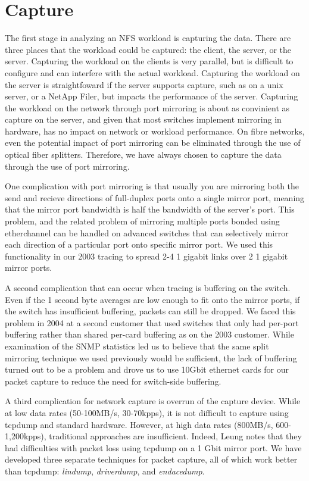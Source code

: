 \section{Capture}
\label{sec:capture}

The first stage in analyzing an NFS workload is capturing the data.
There are three places that the workload could be captured: the
client, the server, or the server.  Capturing the workload on the
clients is very parallel, but is difficult to configure and can
interfere with the actual workload.  Capturing the workload on the
server is straightfoward if the server supports capture, such as on a
unix server, or a NetApp Filer, but impacts the performance of the
server.  Capturing the workload on the network through port mirroring
is about as convinient as capture on the server, and given that most
switches implement mirroring in hardware, has no impact on network or
workload performance.  On fibre networks, even the potential impact of
port mirroring can be eliminated through the use of optical fiber
splitters. Therefore, we have always chosen to capture the
data through the use of port mirroring.

One complication with port mirroring is that usually you are mirroring
both the send and recieve directions of full-duplex ports onto a
single mirror port, meaning that the mirror port bandwidth is half the
bandwidth of the server's port.  This problem, and the related problem
of mirroring multiple ports bonded using etherchannel can be handled
on advanced switches that can selectively mirror each direction of a
particular port onto specific mirror port.  We used this functionality
in our 2003 tracing to spread 2-4 1 gigabit links over 2 1 gigabit
mirror ports.

A second complication that can occur when tracing is buffering on the
switch.  Even if the 1 second byte averages are low enough to fit onto
the mirror ports, if the switch has insufficient buffering, packets
can still be dropped.  We faced this problem in 2004 at a second
customer that used switches that only had per-port buffering rather
than shared per-card buffering as on the 2003 customer.  While
examination of the SNMP statistics led us to believe that the same
split mirroring technique we used previously would be sufficient, the
lack of buffering turned out to be a problem and drove us to use
10Gbit ethernet cards for our packet capture to reduce the need for
switch-side buffering.

A third complication for network capture is overrun of the capture
device.  While at low data rates (50-100MB/s, 30-70kpps), it is not
difficult to capture using tcpdump and standard hardware.  However, at
high data rates (800MB/s, 600-1,200kpps), traditional approaches are
insufficient. Indeed, Leung\cite{LeungUsenix08} notes that they 
had difficulties with packet loss using tcpdump on a 1 Gbit mirror
port.  We have developed three separate techniques for packet capture,
all of which work better than tcpdump: {\it lindump}, {\it
driverdump}, and {\it endacedump}.

